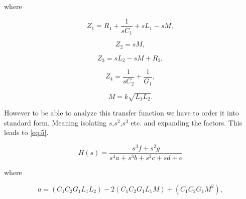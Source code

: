 where

\begin{equation} \label{eq:4_1}
    Z_1 = R_1 + \frac{1}{s C_1} + s L_1 - s M,
\end{equation}

\begin{equation} \label{eq:4_2}
    Z_2 = s M,
\end{equation}

\begin{equation} \label{eq:4_3}
    Z_3 = s L_2 - s M + R_2,
\end{equation}

\begin{equation} \label{eq:4_4}
    Z_4 = \frac{1}{s C_2} + \frac{1}{G_1},
\end{equation}

\begin{equation} \label{eq:4_5}
    M = k \sqrt{L_1 L_2}.
\end{equation}


However to be able to analyze this transfer function we have to order it into standard form. Meaning isolating $s$,$s^2$,$s^3$ etc. and expanding the factors. This leads to \cref{eq:5}.


\begin{equation} \label{eq:5}
    H(s) = \frac{s^3 f + s^2 g}{s^4 a + s^3 b + s^2 c + s d + e}
\end{equation}

where

\begin{equation} \label{eq:5_1}
    a = (C_1 C_2 G_1 L_1 L_2)-2 (C_1 C_2 G_1 L_1 M)+(C_1 C_2 G_1 M^2),
\end{equation}

